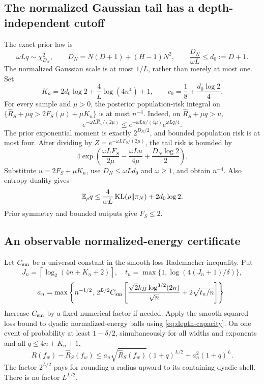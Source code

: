 \subsection{The normalized Gaussian tail has a depth-independent cutoff}
The exact prior law is
\[
 \omega Lq\sim\chi^2_{D_N},\qquad
 D_N=N(D+1)+(H-1)N^2,
 \qquad \frac{D_N}{\omega L}\le d_0:=D+1.
\]
The normalized Gaussian scale is at most $1/L$, rather than merely at most one. Set
\begin{equation}
 K_n=2d_0\log2+\frac4L\log(4n^4)+1,
 \qquad c_0=\frac18+\frac{d_0\log2}4.
 \label{eq:depth-tail-cutoff}
\end{equation}
For every sample and $\mu>0$, the posterior population-risk integral on
$\{\widehat R_S+\mu q>2F_S(\mu)+\mu K_n\}$ is at most $n^{-4}$.
Indeed, on $\widehat R_S+\mu q>u$,
\[
 e^{-\omega L\widehat R_S/(2\mu)}
 \le e^{-\omega Lu/(4\mu)}e^{\omega Lq/4}.
\]
The prior exponential moment is exactly $2^{D_N/2}$, and bounded population risk is at most four. After dividing by $Z=e^{-\omega LF_S/(2\mu)}$, the tail risk is bounded by
\[
 4\exp\left(\frac{\omega LF_S}{2\mu}-\frac{\omega Lu}{4\mu}
                                     +\frac{D_N\log2}2\right).
\]
Substitute $u=2F_S+\mu K_n$, use $D_N\le\omega Ld_0$ and $\omega\ge1$, and obtain $n^{-4}$. Also entropy duality gives
\begin{equation}
 \mathbb E_\rho q\le\frac4{\omega L}\operatorname{KL}(\rho\Vert\pi_N)+2d_0\log2.
 \label{eq:depth-entropy}
\end{equation}
Prior symmetry and bounded outputs give $F_S\le2$.

\subsection{An observable normalized-energy certificate}
Let $C_{\rm sm}$ be a universal constant in the smooth-loss Rademacher inequality. Put
\[
 J_n=\left\lceil\log_2(4n+K_n+2)\right\rceil,
 \quad t_n=\max\{1,\log(4(J_n+1)/\delta)\},
\]
\begin{equation}
 a_n=\max\left\{n^{-1/2},\,
 2^{L/2}C_{\rm sm}\left[
 \frac{\sqrt2k_H\log^{3/2}(2n)}{\sqrt n}
                   +2\sqrt{t_n/n}\right]\right\}.
 \label{eq:depth-statistical-constant}
\end{equation}
Increase $C_{\rm sm}$ by a fixed numerical factor if needed. Apply the smooth squared-loss bound to dyadic normalized-energy balls using \eqref{eq:depth-capacity}. On one event of probability at least $1-\delta/2$, simultaneously for all widths and exponents and all $q\le4n+K_n+1$,
\[
 R(f_w)-\widehat R_S(f_w)
 \le a_n\sqrt{\widehat R_S(f_w)}(1+q)^{L/2}
                            +a_n^2(1+q)^L.
\]
The factor $2^{L/2}$ pays for rounding a radius upward to its containing dyadic shell. There is no factor $L^{L/2}$.

